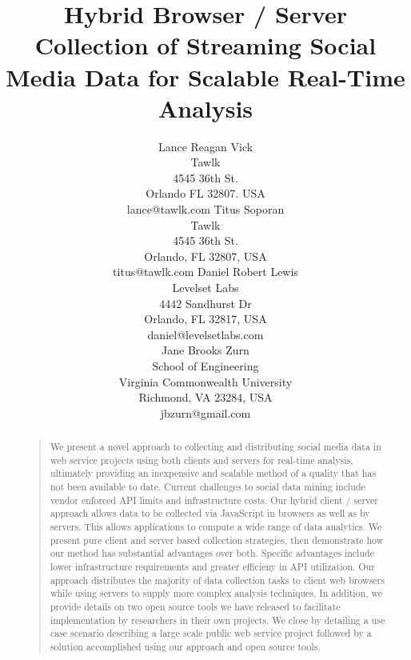 \documentclass[letterpaper]{article}
\begin{document}
\title{Hybrid Browser / Server Collection of Streaming Social\\
Media Data for Scalable Real-Time Analysis}

\author{
Lance Reagan Vick\\
Tawlk\\
4545 36th St.\\
Orlando FL 32807. USA\\
lance@tawlk.com
\And
Titus Soporan\\
Tawlk\\
4545 36th St.\\
Orlando, FL 32807, USA\\
titus@tawlk.com
\And
Daniel Robert Lewis\\
Levelset Labs\\
4442 Sandhurst Dr\\
Orlando, FL 32817, USA \\
daniel@levelsetlabs.com\\
\And
Jane Brooks Zurn\\
School of Engineering \\
Virginia Commonwealth University \\ 
Richmond, VA 23284, USA \\
jbzurn@gmail.com
}
\maketitle

\begin{abstract}
\begin{quote}
We present a novel approach to collecting and distributing social media data in web service projects using both clients and servers for real-time analysis, ultimately providing an inexpensive and scalable method of a quality that has not been available to date. Current challenges to social data mining include vendor enforced API limits and infrastructure costs. Our hybrid client / server approach allows data to be collected via JavaScript in browsers as well as by servers. This allows applications to compute a wide range of data analytics. We present pure client and server based collection strategies, then demonstrate how our method has substantial advantages over both. Specific advantages include lower infrastructure requirements and greater efficieny in API utilization. Our approach distributes the majority of data collection tasks to client web browsers while using servers to supply more complex analysis techniques. In addition, we provide details on two open source tools we have released to facilitate implementation by researchers in their own projects. We close by detailing a use case scenario describing a large scale public web service project followed by a solution accomplished using our approach and open source tools.
\end{quote}
\end{abstract}
\end{document}
